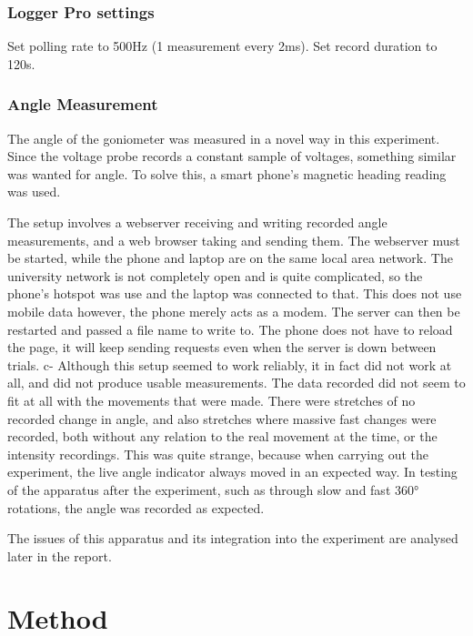\subsubsection*{Logger Pro settings}
Set polling rate to 500Hz (1 measurement every 2ms). Set record duration to 120s.

\subsubsection*{Angle Measurement}

The angle of the goniometer was measured in a novel way in this experiment. Since the voltage probe records a constant sample of voltages, something similar was wanted for angle. To solve this, a smart phone's magnetic heading reading was used.

The setup involves a webserver receiving and writing recorded angle measurements, and a web browser taking and sending them. The webserver must be started, while the phone and laptop are on the same local area network. The university network is not completely open and is quite complicated, so the phone's hotspot was use and the laptop was connected to that. This does not use mobile data however, the phone merely acts as a modem. The server can then be restarted and passed a file name to write to. The phone does not have to reload the page, it will keep sending requests even when the server is down between trials. c-
Although this setup seemed to work reliably, it in fact did not work at all, and did not produce usable measurements. The data recorded did not seem to fit at all with the movements that were made. There were stretches of no recorded change in angle, and also stretches where massive fast changes were recorded, both without any relation to the real movement at the time, or the intensity recordings. This was quite strange, because when carrying out the experiment, the live angle indicator always moved in an expected way. In testing of the apparatus after the experiment, such as through slow and fast 360° rotations, the angle was recorded as expected.

The issues of this apparatus and its integration into the experiment are analysed later in the report.

\section*{Method}

